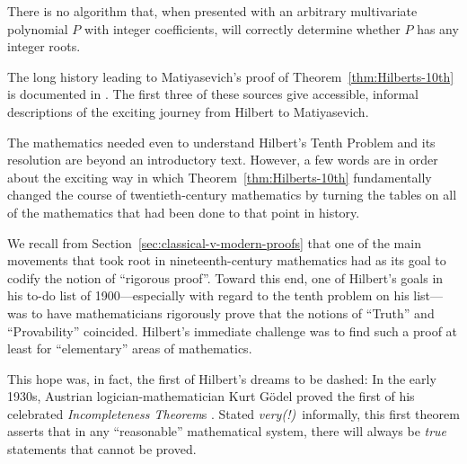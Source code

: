 \noindent {}

\bigskip

\begin{theorem}
\label{thm:Hilberts-10th}
There is no algorithm that, when presented with an arbitrary multivariate polynomial $P$ with integer coefficients, will correctly determine whether $P$ has any integer roots.
\end{theorem}

The long history leading to Matiyasevich's proof of Theorem~\ref{thm:Hilberts-10th} is documented in \cite{Davis73,DavisH73,DavisMR76,Matiyasevich93}.  The first three of these sources give accessible, informal descriptions of the exciting journey from Hilbert to Matiyasevich.

\medskip

The mathematics needed even to understand Hilbert's Tenth Problem and its resolution are beyond an introductory text.  However, a few words are in order about the exciting way in which Theorem~\ref{thm:Hilberts-10th} fundamentally changed the course of twentieth-century mathematics by turning the tables on all of the mathematics that had been done to that point in history.

\medskip

We recall from Section~\ref{sec:classical-v-modern-proofs} that one of the main movements that took root in nineteenth-century mathematics had as its goal to codify the notion of ``rigorous proof''.  Toward this end, one of Hilbert's goals in his to-do list of 1900---especially with regard to the tenth problem on his list---was to have mathematicians rigorously prove that the notions of ``Truth'' and ``Provability'' coincided.  Hilbert's immediate challenge was to find such a proof at least for ``elementary'' areas of mathematics.

\smallskip

 

This hope was, in fact, the first of Hilbert's dreams to be dashed: In the early 1930s, Austrian logician-mathematician Kurt G\"{o}del proved the first of his celebrated {\it Incompleteness Theorem}s \cite{Goedel31}.  Stated {\em very(!)}~informally, this first theorem asserts that in any ``reasonable'' mathematical system, there will always be {\em true} statements that cannot be proved.

